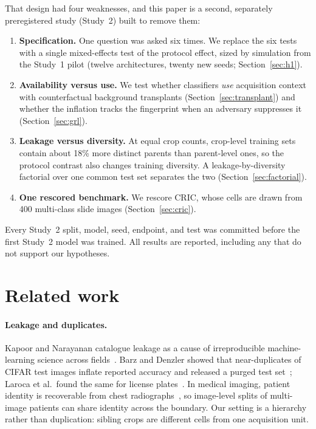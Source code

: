 \documentclass[11pt]{article}
\begin{document}
That design had four weaknesses, and this paper is a second, separately preregistered
study (Study~2) built to remove them:
\begin{enumerate}
\item \textbf{Specification.} One question was asked six times. We replace the six tests
  with a single mixed-effects test of the protocol effect, sized by simulation from the
  Study~1 pilot (twelve architectures, twenty new seeds; Section~\ref{sec:h1}).
\item \textbf{Availability versus use.} We test whether classifiers \emph{use} acquisition
  context with counterfactual background transplants (Section~\ref{sec:transplant}) and
  whether the inflation tracks the fingerprint when an adversary suppresses it
  (Section~\ref{sec:grl}).
\item \textbf{Leakage versus diversity.} At equal crop counts, crop-level training sets
  contain about 18\% more distinct parents than parent-level ones, so the protocol
  contrast also changes training diversity. A leakage-by-diversity factorial over one
  common test set separates the two (Section~\ref{sec:factorial}).
\item \textbf{One rescored benchmark.} We rescore CRIC, whose cells are drawn from 400
  multi-class slide images (Section~\ref{sec:cric}).
\end{enumerate}
Every Study~2 split, model, seed, endpoint, and test was committed before the first
Study~2 model was trained. All results are reported, including any that do not support
our hypotheses.

\section{Related work}

\paragraph{Leakage and duplicates.} Kapoor and Narayanan catalogue leakage as a cause of
irreproducible machine-learning science across fields~\citep{kapoor2023leakage}. Barz and
Denzler showed that near-duplicates of CIFAR test images inflate reported accuracy and
released a purged test set~\citep{barz2020cifair}; Laroca et al.\ found the same for
license plates~\citep{laroca2023lpr}. In medical imaging, patient identity is recoverable
from chest radiographs~\citep{packhauser2022reidentification}, so image-level splits of
multi-image patients can share identity across the boundary. Our setting is a hierarchy
rather than duplication: sibling crops are different cells from one acquisition unit.
\end{document}
